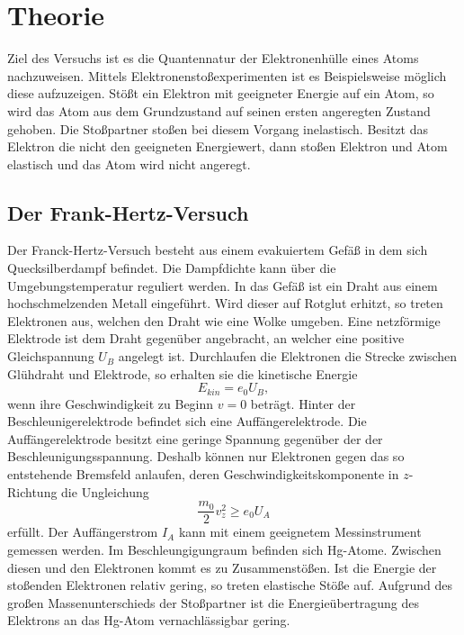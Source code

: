 \section{Theorie}
\label{sec:Theorie}
Ziel des Versuchs ist es die Quantennatur der Elektronenhülle eines Atoms nachzuweisen.
Mittels Elektronenstoßexperimenten ist es Beispielsweise möglich diese aufzuzeigen.
Stößt ein Elektron mit geeigneter Energie auf ein Atom, so wird das Atom aus dem Grundzustand auf seinen ersten angeregten Zustand gehoben.
Die Stoßpartner stoßen bei diesem Vorgang inelastisch.
Besitzt das Elektron die nicht den geeigneten Energiewert, dann stoßen Elektron und Atom elastisch und das Atom wird nicht angeregt.

\subsection{Der Frank-Hertz-Versuch}
Der Franck-Hertz-Versuch besteht aus einem evakuiertem Gefäß in dem sich Quecksilberdampf befindet.
Die Dampfdichte kann über die Umgebungstemperatur reguliert werden.
In das Gefäß ist ein Draht aus einem hochschmelzenden Metall eingeführt.
Wird dieser auf Rotglut erhitzt, so treten Elektronen aus, welchen den Draht wie eine Wolke umgeben.
Eine netzförmige Elektrode ist dem Draht gegenüber angebracht, an welcher eine positive Gleichspannung $U_B$ angelegt ist.
Durchlaufen die Elektronen die Strecke zwischen Glühdraht und Elektrode, so erhalten sie die kinetische Energie
\begin{equation}
  \label{eq:ekin}
  E_{kin} = e_0 U_B  ,
\end{equation}
wenn ihre Geschwindigkeit zu Beginn $v= 0$ beträgt.
Hinter der Beschleunigerelektrode befindet sich eine Auffängerelektrode.
Die Auffängerelektrode besitzt eine geringe Spannung gegenüber der der Beschleunigungsspannung.
Deshalb können nur Elektronen gegen das so entstehende Bremsfeld anlaufen, deren Geschwindigkeitskomponente in $z$-Richtung die Ungleichung
\begin{equation}
  \label{eq:ungl}
  \frac{m_0}{2}v_z^2 \geq e_0 U_A
\end{equation}
erfüllt.
Der Auffängerstrom $I_A$ kann mit einem geeignetem Messinstrument gemessen werden.
Im Beschleungigungraum befinden sich Hg-Atome.
Zwischen diesen und den Elektronen kommt es zu Zusammenstößen.
Ist die Energie der stoßenden Elektronen relativ gering, so treten elastische Stöße auf.
Aufgrund des großen Massenunterschieds der Stoßpartner ist die Energieübertragung des Elektrons an das Hg-Atom vernachlässigbar gering.
